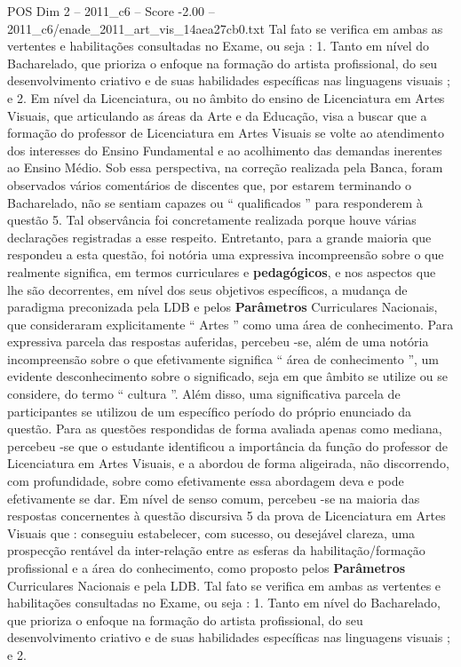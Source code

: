 \begin{textsample}{POS Dim 2 – 2011\_c6 – Score -2.00 – 2011\_c6/enade\_2011\_art\_vis\_14aea27cb0.txt}
Tal fato se verifica em ambas as vertentes e habilitações consultadas no Exame, ou seja : 1.
Tanto em nível do Bacharelado, que prioriza o enfoque na formação do artista profissional, do seu desenvolvimento criativo e de suas habilidades específicas nas linguagens visuais ; e 2.
Em nível da Licenciatura, ou no âmbito do ensino de Licenciatura em Artes Visuais, que articulando as áreas da Arte e da Educação, visa a buscar que a formação do professor de Licenciatura em Artes Visuais se volte ao atendimento dos interesses do Ensino Fundamental e ao acolhimento das demandas inerentes ao Ensino Médio.
Sob essa perspectiva, na correção realizada pela Banca, foram observados vários comentários de discentes que, por estarem terminando o Bacharelado, não se sentiam capazes ou “ qualificados ” para responderem à questão 5.
Tal observância foi concretamente realizada porque houve várias declarações registradas a esse respeito.
Entretanto, para a grande maioria que respondeu a esta questão, foi notória uma expressiva incompreensão sobre o que realmente significa, em termos curriculares e \textbf{pedagógicos}, e nos aspectos que lhe são decorrentes, em nível dos seus objetivos específicos, a mudança de paradigma preconizada pela LDB e pelos \textbf{Parâmetros} Curriculares Nacionais, que consideraram explicitamente “ Artes ” como uma área de conhecimento.
Para expressiva parcela das respostas auferidas, percebeu -se, além de uma notória incompreensão sobre o que efetivamente significa “ área de conhecimento ”, um evidente desconhecimento sobre o significado, seja em que âmbito se utilize ou se considere, do termo “ cultura ”.
Além disso, uma significativa parcela de participantes se utilizou de um específico período do próprio enunciado da questão.
Para as questões respondidas de forma avaliada apenas como mediana, percebeu -se que o estudante identificou a importância da função do professor de Licenciatura em Artes Visuais, e a abordou de forma aligeirada, não discorrendo, com profundidade, sobre como efetivamente essa abordagem deva e pode efetivamente se dar.
Em nível de senso comum, percebeu -se na maioria das respostas concernentes à questão discursiva 5 da prova de Licenciatura em Artes Visuais que : conseguiu estabelecer, com sucesso, ou desejável clareza, uma prospecção rentável da inter-relação entre as esferas da habilitação/formação profissional e a área do conhecimento, como proposto pelos \textbf{Parâmetros} Curriculares Nacionais e pela LDB.
Tal fato se verifica em ambas as vertentes e habilitações consultadas no Exame, ou seja : 1.
Tanto em nível do Bacharelado, que prioriza o enfoque na formação do artista profissional, do seu desenvolvimento criativo e de suas habilidades específicas nas linguagens visuais ; e 2.

\end{textsample}
